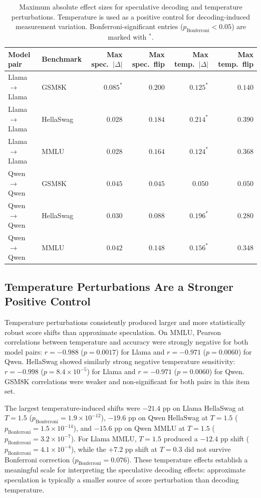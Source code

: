 \documentclass{article}
\begin{document}
\begin{table}[t]
\centering
\caption{Maximum absolute effect sizes for speculative decoding and temperature perturbations. Temperature is used as a positive control for decoding-induced measurement variation. Bonferroni-significant entries ($p_{\text{Bonferroni}} < 0.05$) are marked with ${}^{*}$.}
\label{tab:impact}
\small
\begin{tabular}{llrrrr}
\toprule
Model pair & Benchmark & Max spec.\ $|\Delta|$ & Max spec.\ flip & Max temp.\ $|\Delta|$ & Max temp.\ flip \\
\midrule
Llama $\rightarrow$ Llama & GSM8K     & $0.085^{*}$ & $0.200$ & $0.125^{*}$ & $0.140$ \\
Llama $\rightarrow$ Llama & HellaSwag & $0.028$     & $0.184$ & $0.214^{*}$ & $0.390$ \\
Llama $\rightarrow$ Llama & MMLU      & $0.028$     & $0.164$ & $0.124^{*}$ & $0.368$ \\
Qwen $\rightarrow$ Qwen   & GSM8K     & $0.045$     & $0.045$ & $0.050$     & $0.050$ \\
Qwen $\rightarrow$ Qwen   & HellaSwag & $0.030$     & $0.088$ & $0.196^{*}$ & $0.280$ \\
Qwen $\rightarrow$ Qwen   & MMLU      & $0.042$     & $0.148$ & $0.156^{*}$ & $0.348$ \\
\bottomrule
\end{tabular}
\end{table}

\subsection{Temperature Perturbations Are a Stronger Positive Control}

Temperature perturbations consistently produced larger and more statistically robust score shifts than approximate speculation. On MMLU, Pearson correlations between temperature and accuracy were strongly negative for both model pairs: $r = -0.988$ ($p = 0.0017$) for Llama and $r = -0.971$ ($p = 0.0060$) for Qwen. HellaSwag showed similarly strong negative temperature sensitivity: $r = -0.998$ ($p = 8.4 \times 10^{-5}$) for Llama and $r = -0.971$ ($p = 0.0060$) for Qwen. GSM8K correlations were weaker and non-significant for both pairs in this item set.

The largest temperature-induced shifts were $-21.4$ pp on Llama HellaSwag at $T{=}1.5$ ($p_{\text{Bonferroni}} = 1.9 \times 10^{-12}$), $-19.6$ pp on Qwen HellaSwag at $T{=}1.5$ ($p_{\text{Bonferroni}} = 1.5 \times 10^{-14}$), and $-15.6$ pp on Qwen MMLU at $T{=}1.5$ ($p_{\text{Bonferroni}} = 3.2 \times 10^{-7}$). For Llama MMLU, $T{=}1.5$ produced a $-12.4$ pp shift ($p_{\text{Bonferroni}} = 4.1 \times 10^{-4}$), while the $+7.2$ pp shift at $T{=}0.3$ did not survive Bonferroni correction ($p_{\text{Bonferroni}} = 0.076$). These temperature effects establish a meaningful scale for interpreting the speculative decoding effects: approximate speculation is typically a smaller source of score perturbation than decoding temperature.
\end{document}
